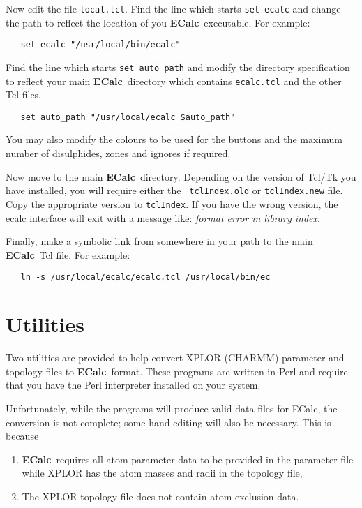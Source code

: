 \documentclass[12pt]{article}
\newcommand{\ecalc}{\mbox{\bf ECalc}}
\begin{document}
Now edit the file {\tt local.tcl}. Find the line which starts {\tt set
ecalc} and change the path to reflect the location of you \ecalc\
executable. For example:
\begin{verbatim}
   set ecalc "/usr/local/bin/ecalc"
\end{verbatim}

Find the line which starts {\tt set auto\_path} and modify the
directory specification to reflect your main \ecalc\ directory which
contains {\tt ecalc.tcl} and the other Tcl files.
\begin{verbatim}
   set auto_path "/usr/local/ecalc $auto_path"
\end{verbatim}

You may also modify the colours to be used for the buttons and the
maximum number of disulphides, zones and ignores if required.

Now move to the main \ecalc\ directory. Depending on the version of
Tcl/Tk you have installed, you will require either the {\tt
tclIndex.old} or {\tt tclIndex.new} file. Copy the appropriate version
to {\tt tclIndex}. If you have the wrong version, the ecalc interface
will exit with a message like: {\em format error in library index}.

Finally, make a symbolic link from somewhere in your path to the main
\ecalc\ Tcl file. For example:
\begin{verbatim}
   ln -s /usr/local/ecalc/ecalc.tcl /usr/local/bin/ec
\end{verbatim}



\section{Utilities}
\label{sec:util}

Two utilities are provided to help convert XPLOR (CHARMM) parameter and
topology files to \ecalc\ format. These programs are written in Perl
and require that you have the Perl interpreter installed on your
system.

Unfortunately, while the programs will produce valid data files for
ECalc, the conversion is not complete; some hand editing will also be
necessary. This is because 
\begin{enumerate}
\item \ecalc\ requires all atom parameter data to be provided in the
parameter file while XPLOR has the atom masses and radii in the
topology file,
\item The XPLOR topology file does not contain atom exclusion data.
\end{enumerate}
\end{document}
